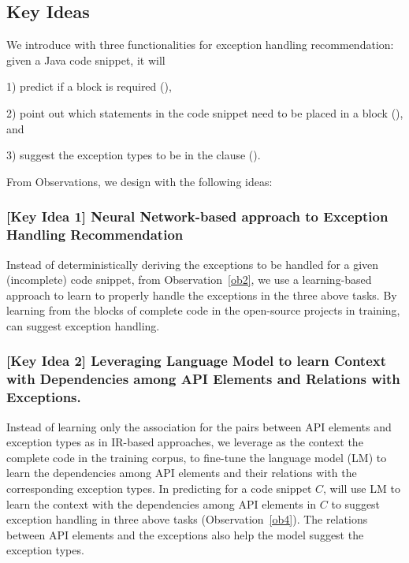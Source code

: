 \subsection{Key Ideas}
\label{key:sec}

We introduce {\tool} with three functionalities for exception handling
recommendation: given a Java code snippet, it will

1) predict if a  block is required ({\xblock}),

2) point out which statements in the code snippet need to be placed in
a  block ({\xstate}), and

3) suggest the exception types to be in the 
clause ({\xtype}).

From Observations, we design {\tool} with the following
ideas:

\subsubsection{{\bf [Key Idea 1] Neural Network-based approach to Exception Handling Recommendation}}
Instead of deterministically deriving the exceptions to be handled for
a given (incomplete) code snippet, from Observation~\ref{ob2}, we
use a learning-based approach to learn to properly handle the
exceptions in the three above tasks.
By learning from the  blocks of complete code in
the open-source projects in training, {\tool} can
suggest exception handling.




\vspace{2pt}
\subsubsection{\bf [Key Idea 2] Leveraging Language Model to learn Context with Dependencies among API Elements and Relations with Exceptions.}
  
Instead of learning only the association for the pairs between API
elements and exception types as in IR-based approaches, we leverage as
the context the complete code in the training corpus, to fine-tune the
language model (LM) to learn the dependencies among API elements and their
relations with the corresponding exception types.
%
In predicting for a code snippet $C$, {\tool} will use LM to learn the
context with the dependencies among API elements in $C$ to suggest
exception handling in three above tasks (Observation~\ref{ob4}). The
relations between API elements and the exceptions also help the model
suggest the exception types.

